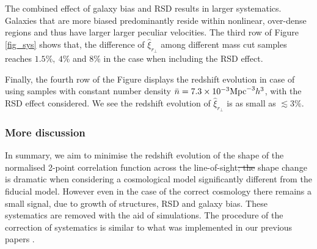 \documentclass[iop]{emulateapj}
\providecommand{\DIFadd}[1]{{\protect\color{blue}\uwave{#1}}} %
\providecommand{\DIFdel}[1]{{\protect\color{red}\sout{#1}}}                      %
\providecommand{\DIFaddbegin}{} %
\providecommand{\DIFaddend}{} %
\providecommand{\DIFdelbegin}{} %
\providecommand{\DIFdelend}{} %
\begin{document}
The combined effect of galaxy bias and RSD results in larger systematics.
Galaxies that are more biased predominantly reside within nonlinear, over-dense regions and thus have larger larger peculiar velocities.
The third row of Figure \ref{fig_sys} shows that, 
the difference of $\hat \xi_{r_\perp}$ among different mass cut samples reaches $1.5\%,\ 4\%$ and $8\%$ in the case when including the RSD effect.

Finally, the fourth row of the Figure displays the 
redshift evolution in case of using samples with constant number density $\bar n=7.3\times 10^{-3} {\rm Mpc}^{-3}h^3$, 
with the RSD effect considered. %
We see the redshift evolution of $\hat \xi_{r_\perp}$ is as small as $\lesssim3\%$.









\subsubsection{More discussion}

In summary, we aim to minimise the redshift evolution of the shape of the normalised  2-point correlation function across the line-of-sight\DIFdelbegin \DIFdel{; 
the }\DIFdelend \DIFaddbegin \DIFadd{. We find that this }\DIFaddend shape change is dramatic when considering a cosmological model significantly different from the fiducial model.
However even in the case of the correct cosmology there remains a small signal, due to growth of structures, RSD and galaxy bias. These systematics are removed with the aid of simulations.
The procedure of the correction of systematics is similar to what was implemented in our previous papers \cite{Li2014,Li2015,Li2016}.
\end{document}
